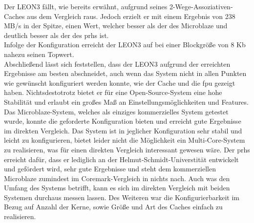 \newpage
 Der LEON3 fällt, wie bereits erwähnt, aufgrund seines 2-Wege-Assoziativen-Caches aus dem Vergleich raus. Jedoch erzielt
er mit einem Ergebnis von 238 MB/s in der Spitze, einen Wert, welcher besser als der des Microblaze und deutlich besser als der des \ac{prhs} ist.\\ Infolge der
Konfiguration erreicht der LEON3 auf bei einer Blockgröße von 8 Kb nahezu seinen Topwert.\\
Abschließend lässt sich feststellen, dass der LEON3 aufgrund der erreichten Ergebnisse am besten abschneidet, auch wenn das System nicht in allen Punkten
wie gewünscht konfiguriert werden konnte, wie der Cache und die \ac{fpu} gezeigt haben. Nichtsdestotrotz bietet er für eine Open-Source-System eine hohe Stabilität
und erlaubt ein großes Maß an Einstellungsmöglichkeiten und Features. Das Microblaze-System, welches als einziges kommerzielles System getestet wurde, konnte die geforderte
Konfiguration bieten und erreicht gute Ergebnisse im direkten Vergleich. Das System ist in jeglicher Konfiguration sehr stabil und leicht zu konfigurieren, bietet
leider nicht die Möglichkeit ein Multi-Core-System zu realisieren, was für einen direkten Vergleich interessant gewesen wäre. Der \ac{prhs} erreicht dafür, dass er
lediglich an der Helmut-Schmidt-Universtität entwickelt und gefördert wird, sehr gute Ergebnisse und steht dem kommerziellen Microblaze zumindest im Coremark-Vergleich
in nichts nach. Auch was den Umfang des Systems betrifft, kann es sich im direkten Vergleich mit beiden Systemen durchaus messen lassen. Des Weiteren war die
Konfigurierbarkeit im Bezug auf Anzahl der Kerne, sowie Größe und Art des Caches einfach zu realisieren.\\
